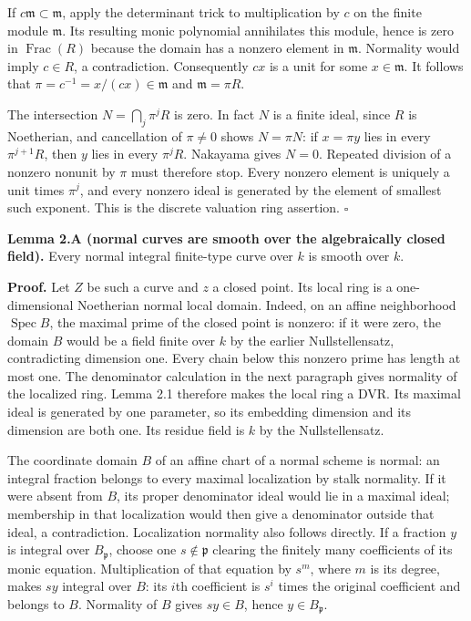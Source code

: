 \documentclass[11pt,a4paper,openany]{report}
\begin{document}
If \(c\mathfrak m\subset\mathfrak m\), apply the determinant trick to multiplication by \(c\) on the finite module \(\mathfrak m\). Its resulting monic polynomial annihilates this module, hence is zero in \(\operatorname{Frac}(R)\) because the domain has a nonzero element in \(\mathfrak m\). Normality would imply \(c\in R\), a contradiction. Consequently \(cx\) is a unit for some \(x\in\mathfrak m\). It follows that \(\pi=c^{-1}=x/(cx)\in\mathfrak m\) and \(\mathfrak m=\pi R\).

The intersection \(N=\bigcap_j\pi^jR\) is zero. In fact \(N\) is a finite ideal, since \(R\) is Noetherian, and cancellation of \(\pi\ne0\) shows \(N=\pi N\): if \(x=\pi y\) lies in every \(\pi^{j+1}R\), then \(y\) lies in every \(\pi^jR\). Nakayama gives \(N=0\). Repeated division of a nonzero nonunit by \(\pi\) must therefore stop. Every nonzero element is uniquely a unit times \(\pi^j\), and every nonzero ideal is generated by the element of smallest such exponent. This is the discrete valuation ring assertion. \(\square\)

\textbf{Lemma 2.A (normal curves are smooth over the algebraically closed field).} Every normal integral finite-type curve over \(k\) is smooth over \(k\).

\textbf{Proof.} Let \(Z\) be such a curve and \(z\) a closed point. Its local ring is a one-dimensional Noetherian normal local domain. Indeed, on an affine neighborhood \(\operatorname{Spec}B\), the maximal prime of the closed point is nonzero: if it were zero, the domain \(B\) would be a field finite over \(k\) by the earlier Nullstellensatz, contradicting dimension one. Every chain below this nonzero prime has length at most one. The denominator calculation in the next paragraph gives normality of the localized ring. Lemma 2.1 therefore makes the local ring a DVR. Its maximal ideal is generated by one parameter, so its embedding dimension and its dimension are both one. Its residue field is \(k\) by the Nullstellensatz.

The coordinate domain \(B\) of an affine chart of a normal scheme is normal: an integral fraction belongs to every maximal localization by stalk normality. If it were absent from \(B\), its proper denominator ideal would lie in a maximal ideal; membership in that localization would then give a denominator outside that ideal, a contradiction. Localization normality also follows directly. If a fraction \(y\) is integral over \(B_{\mathfrak p}\), choose one \(s\notin\mathfrak p\) clearing the finitely many coefficients of its monic equation. Multiplication of that equation by \(s^m\), where \(m\) is its degree, makes \(sy\) integral over \(B\): its \(i\)th coefficient is \(s^i\) times the original coefficient and belongs to \(B\). Normality of \(B\) gives \(sy\in B\), hence \(y\in B_{\mathfrak p}\).
\end{document}

